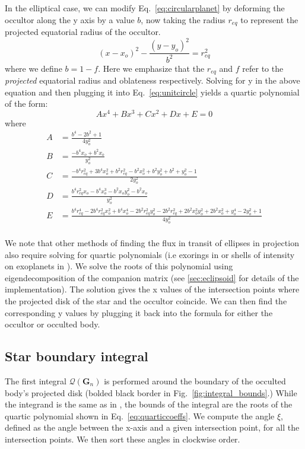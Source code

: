 \documentclass[twocolumn]{aastex631}
\begin{document}
In the elliptical case, we can modify Eq.~\ref{eq:circularplanet} by deforming the occultor along the y axis by a value $b$, now taking the radius $r_{eq}$ to represent the projected equatorial radius of the occultor. 
\begin{equation} \label{eq:ellipticalplanet}
(x-x_{o})^2-\frac{(y-y_o)^2}{b^2} = r_{eq}^2
\end{equation}
where we define $b=1-f$. Here we emphasize that the $r_{eq}$ and $f$ refer to the \textit{projected} equatorial radius and oblateness respectively. 
Solving for y in the above equation and then plugging it into Eq.~\ref{eq:unitcircle} yields a quartic polynomial of the form: 
\begin{equation} \label{eq:quarticform}
Ax^4 + Bx^3 + Cx^2 + Dx + E = 0
\end{equation} 
where
\onecolumngrid
\begin{equation} \label{eq:quarticcoeffs}
\begin{aligned}
A &= \frac{b^4 - 2b^2 + 1}{4y_o^2}\\
B &= \frac{-b^4x_o + b^2x_o}{y_o^2}\\
C &= \frac{-b^4r_{eq}^2 + 3b^4x_o^2 + b^2r_{eq}^2 - b^2x_o^2 + b^2y_o^2 + b^2 + y_o^2 - 1}{2y_o^2} \\
D &= \frac{b^4r_{eq}^2x_o - b^4x_o^3 - b^2x_oy_o^2 - b^2x_o}{y_o^2} \\
E &= \frac{b^4r_{eq}^4 - 2b^4r_{eq}^2x_o^2 + b^4x_o^4 - 2b^2r_{eq}^2y_o^2 - 2b^2r_{eq}^2 + 2b^2x_o^2y_o^2 + 2b^2x_o^2 + y_o^4 - 2y_o^2 + 1}{4y_o^2}\\
\end{aligned}
\end{equation}

\twocolumngrid
We note that other methods of finding the flux in transit of ellipses in projection also require solving for quartic polynomials (i.e exorings in \citep{rein2023} or shells of intensity on exoplanets in \citep{luger2017}). We solve the roots of this polynomial using eigendecomposition of the companion matrix (see \ref{sec:eclipsoid} for details of the implementation). The solution gives the x values of the intersection points where the projected disk of the star and the occultor coincide. We can then find the corresponding y values by plugging it back into the formula for either the occultor or occulted body. 

\subsection{Star boundary integral}
The first integral $\mathcal{Q}(\mathbf{G}_n)$ is performed around the boundary of the occulted body's projected disk (bolded black border in Fig.~\ref{fig:integral_bounds}.) While the integrand is the same as in \citet{starry2019}, the bounds of the integral are the roots of the quartic polynomial shown in Eq.~\ref{eq:quarticcoeffs}. We compute the angle $\xi$, defined as the angle between the x-axis and a given intersection point, for all the intersection points. We then sort these angles in clockwise order. 
\end{document}

